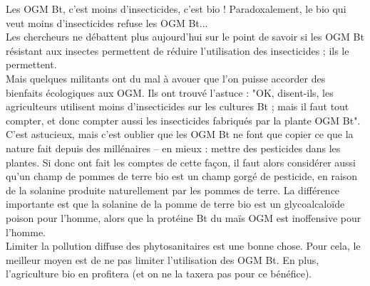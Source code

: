 \documentclass[8pt]{article}
\begin{document}
Les OGM Bt, c'est moins d'insecticides, c'est bio !
Paradoxalement, le bio qui veut moins d'insecticides refuse les OGM Bt...\\

Les chercheurs ne débattent plus aujourd’hui sur le point de savoir si les OGM Bt résistant aux insectes permettent de réduire l’utilisation des insecticides ; ils le permettent.\\

Mais quelques militants ont du mal à avouer que l'on puisse accorder des bienfaits écologiques aux OGM. Ils ont trouvé l'astuce : "OK, disent-ils, les agriculteurs utilisent moins d'insecticides sur les cultures Bt ; mais il faut tout compter, et donc compter aussi les insecticides fabriqués par la plante OGM Bt". C'est astucieux, mais c'est oublier que les OGM Bt ne font que copier ce que la nature fait depuis des millénaires – en mieux : mettre des pesticides dans les plantes. Si donc ont fait les comptes de cette façon, il faut alors considérer aussi qu'un champ de pommes de terre bio est un champ gorgé de pesticide, en raison de la solanine produite naturellement par les pommes de terre. La différence importante est que la solanine de la pomme de terre bio est un glycoalcaloïde poison pour l'homme, alors que la protéine Bt du maïs OGM est inoffensive pour l'homme.\\

Limiter la pollution diffuse des phytosanitaires est une bonne chose.
Pour cela, le meilleur moyen est de ne pas limiter l'utilisation des OGM Bt.
En plus, l'agriculture bio en profitera (et on ne la taxera pas pour ce bénéfice).
\end{document}
